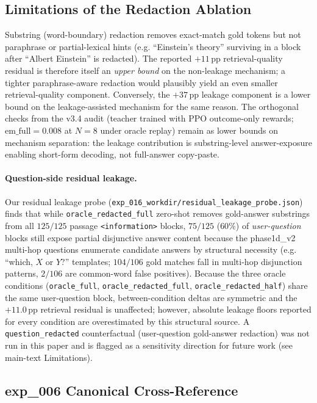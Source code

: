 \subsection{Limitations of the Redaction Ablation}
\label{app:redaction_limitations}

Substring (word-boundary) redaction removes exact-match gold tokens but not paraphrase or partial-lexical hints (e.g. ``Einstein's theory'' surviving in a block after ``Albert Einstein'' is redacted). The reported $+11$\,pp retrieval-quality residual is therefore itself an \emph{upper bound} on the non-leakage mechanism; a tighter paraphrase-aware redaction would plausibly yield an even smaller retrieval-quality component. Conversely, the $+37$\,pp leakage component is a lower bound on the leakage-assisted mechanism for the same reason. The orthogonal checks from the v3.4 audit (teacher trained with PPO outcome-only rewards; $\mathrm{em\_full}=0.008$ at $N{=}8$ under oracle replay) remain as lower bounds on mechanism separation: the leakage contribution is substring-level answer-exposure enabling short-form decoding, not full-answer copy-paste.

\paragraph{Question-side residual leakage.}
Our residual leakage probe (\texttt{exp\_016\_workdir/residual\_leakage\_probe.json}) finds that while \texttt{oracle\_redacted\_full} zero-shot removes gold-answer substrings from all $125/125$ passage \texttt{<information>} blocks, $75/125$ ($60\%$) of \emph{user-question} blocks still expose partial disjunctive answer content because the phase1d\_v2 multi-hop questions enumerate candidate answers by structural necessity (e.g. ``which, $X$ or $Y$?'' templates; $104/106$ gold matches fall in multi-hop disjunction patterns, $2/106$ are common-word false positives). Because the three oracle conditions (\texttt{oracle\_full}, \texttt{oracle\_redacted\_full}, \texttt{oracle\_redacted\_half}) share the same user-question block, between-condition deltas are symmetric and the $+11.0$\,pp retrieval residual is unaffected; however, absolute leakage floors reported for every condition are overestimated by this structural source. A \texttt{question\_redacted} counterfactual (user-question gold-answer redaction) was not run in this paper and is flagged as a sensitivity direction for future work (see main-text Limitations).

\subsection{exp\_006 Canonical Cross-Reference}
\label{app:exp006_full_test}

